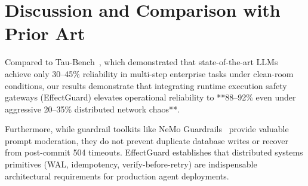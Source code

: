 \section{Discussion and Comparison with Prior Art}
\label{sec:res_discussion}
Compared to Tau-Bench~\cite{yao2024taubench}, which demonstrated that state-of-the-art LLMs achieve only 30--45\% reliability in multi-step enterprise tasks under clean-room conditions, our results demonstrate that integrating runtime execution safety gateways (EffectGuard) elevates operational reliability to **88--92\% even under aggressive 20--35\% distributed network chaos**. 

Furthermore, while guardrail toolkits like NeMo Guardrails~\cite{rebedea2023nemo} provide valuable prompt moderation, they do not prevent duplicate database writes or recover from post-commit 504 timeouts. EffectGuard establishes that distributed systems primitives (WAL, idempotency, verify-before-retry) are indispensable architectural requirements for production agent deployments.
